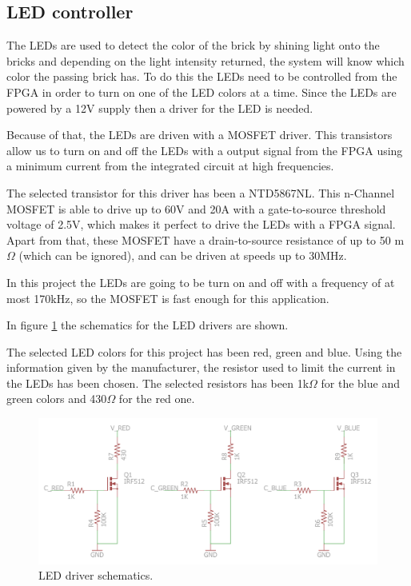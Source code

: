 

\subsection{LED controller}
The LEDs are used to detect the color of the brick by shining light onto the bricks and depending on the light intensity returned, the system will know which color the passing brick has.
To do this the LEDs need to be controlled from the FPGA in order to turn on one of the LED colors at a time.
Since the LEDs are powered by a 12V supply then a driver for the LED is needed. 

Because of that, the LEDs are driven with a MOSFET driver. 
This transistors allow us to turn on and off the LEDs with a output signal from the FPGA using a minimum current from the integrated circuit at high frequencies.

The selected transistor for this driver has been a NTD5867NL. 
This n-Channel MOSFET is able to drive up to 60V and 20A with a gate-to-source threshold voltage of 2.5V, which makes it perfect to drive the LEDs with a FPGA signal.
Apart from that, these MOSFET have a drain-to-source resistance of up to 50 m$\Omega$ (which can be ignored), and can be driven at speeds up to 30MHz.

In this project the LEDs are going to be turn on and off with a frequency of at most 170kHz, so the MOSFET is fast enough for this application.

In figure \ref{fig:LED_driver_sch} the schematics for the LED drivers are shown.

The selected LED colors for this project has been red, green and blue. 
Using the information given by the manufacturer, the resistor used to limit the current in the LEDs has been chosen. The selected resistors has been 1k$\Omega$ for the blue and green colors and 430$\Omega$ for the red one.

\begin{figure}[H]
\centering 
\includegraphics[width = 0.7 \textwidth]{images/leddriver_schematics}
\caption{LED driver schematics.}
\label{fig:LED_driver_sch}
\end{figure}


